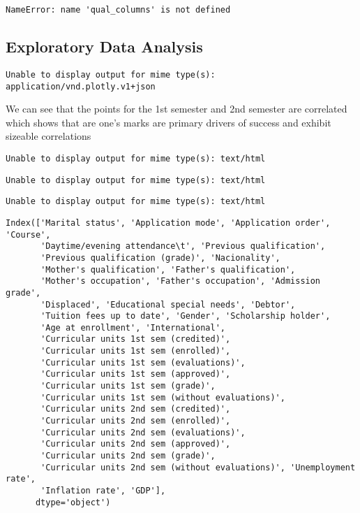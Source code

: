 \documentclass[
  letterpaper,
  DIV=11,
  numbers=noendperiod]{scrartcl}
\begin{document}
\begin{verbatim}
NameError: name 'qual_columns' is not defined
\end{verbatim}

\hypertarget{exploratory-data-analysis}{%
\subsection{Exploratory Data Analysis}\label{exploratory-data-analysis}}

\begin{verbatim}
Unable to display output for mime type(s): application/vnd.plotly.v1+json
\end{verbatim}

We can see that the points for the 1st semester and 2nd semester are
correlated which shows that are one's marks are primary drivers of
success and exhibit sizeable correlations

\begin{verbatim}
Unable to display output for mime type(s): text/html
\end{verbatim}

\begin{verbatim}
Unable to display output for mime type(s): text/html
\end{verbatim}

\begin{verbatim}
Unable to display output for mime type(s): text/html
\end{verbatim}

\begin{verbatim}
Index(['Marital status', 'Application mode', 'Application order', 'Course',
       'Daytime/evening attendance\t', 'Previous qualification',
       'Previous qualification (grade)', 'Nacionality',
       'Mother's qualification', 'Father's qualification',
       'Mother's occupation', 'Father's occupation', 'Admission grade',
       'Displaced', 'Educational special needs', 'Debtor',
       'Tuition fees up to date', 'Gender', 'Scholarship holder',
       'Age at enrollment', 'International',
       'Curricular units 1st sem (credited)',
       'Curricular units 1st sem (enrolled)',
       'Curricular units 1st sem (evaluations)',
       'Curricular units 1st sem (approved)',
       'Curricular units 1st sem (grade)',
       'Curricular units 1st sem (without evaluations)',
       'Curricular units 2nd sem (credited)',
       'Curricular units 2nd sem (enrolled)',
       'Curricular units 2nd sem (evaluations)',
       'Curricular units 2nd sem (approved)',
       'Curricular units 2nd sem (grade)',
       'Curricular units 2nd sem (without evaluations)', 'Unemployment rate',
       'Inflation rate', 'GDP'],
      dtype='object')
\end{verbatim}


\printbibliography
\end{document}
